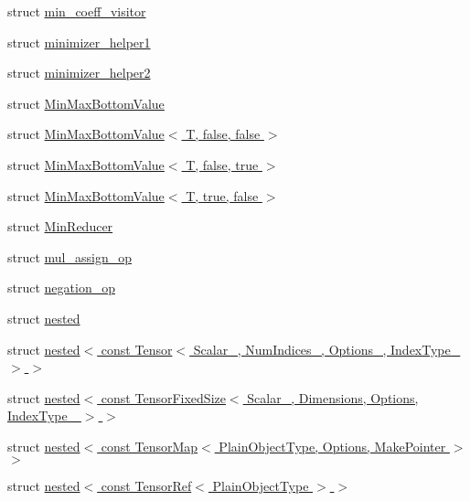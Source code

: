 \begin{DoxyCompactItemize}
struct \hyperlink{struct_eigen_1_1internal_1_1min__coeff__visitor}{min\+\_\+coeff\+\_\+visitor}
\item 
struct \hyperlink{struct_eigen_1_1internal_1_1minimizer__helper1}{minimizer\+\_\+helper1}
\item 
struct \hyperlink{struct_eigen_1_1internal_1_1minimizer__helper2}{minimizer\+\_\+helper2}
\item 
struct \hyperlink{struct_eigen_1_1internal_1_1_min_max_bottom_value}{Min\+Max\+Bottom\+Value}
\item 
struct \hyperlink{struct_eigen_1_1internal_1_1_min_max_bottom_value_3_01_t_00_01false_00_01false_01_4}{Min\+Max\+Bottom\+Value$<$ T, false, false $>$}
\item 
struct \hyperlink{struct_eigen_1_1internal_1_1_min_max_bottom_value_3_01_t_00_01false_00_01true_01_4}{Min\+Max\+Bottom\+Value$<$ T, false, true $>$}
\item 
struct \hyperlink{struct_eigen_1_1internal_1_1_min_max_bottom_value_3_01_t_00_01true_00_01false_01_4}{Min\+Max\+Bottom\+Value$<$ T, true, false $>$}
\item 
struct \hyperlink{struct_eigen_1_1internal_1_1_min_reducer}{Min\+Reducer}
\item 
struct \hyperlink{struct_eigen_1_1internal_1_1mul__assign__op}{mul\+\_\+assign\+\_\+op}
\item 
struct \hyperlink{struct_eigen_1_1internal_1_1negation__op}{negation\+\_\+op}
\item 
struct \hyperlink{struct_eigen_1_1internal_1_1nested}{nested}
\item 
struct \hyperlink{struct_eigen_1_1internal_1_1nested_3_01const_01_tensor_3_01_scalar___00_01_num_indices___00_01_o921ff0e47aa2123e7e0ef990f080072a}{nested$<$ const Tensor$<$ Scalar\+\_\+, Num\+Indices\+\_\+, Options\+\_\+, Index\+Type\+\_\+ $>$ $>$}
\item 
struct \hyperlink{struct_eigen_1_1internal_1_1nested_3_01const_01_tensor_fixed_size_3_01_scalar___00_01_dimensions98981d6c192c4870f523d84eb9e7798b}{nested$<$ const Tensor\+Fixed\+Size$<$ Scalar\+\_\+, Dimensions, Options, Index\+Type\+\_\+ $>$ $>$}
\item 
struct \hyperlink{struct_eigen_1_1internal_1_1nested_3_01const_01_tensor_map_3_01_plain_object_type_00_01_options_00_01_make_pointer_01_4_01_4}{nested$<$ const Tensor\+Map$<$ Plain\+Object\+Type, Options, Make\+Pointer $>$ $>$}
\item 
struct \hyperlink{struct_eigen_1_1internal_1_1nested_3_01const_01_tensor_ref_3_01_plain_object_type_01_4_01_4}{nested$<$ const Tensor\+Ref$<$ Plain\+Object\+Type $>$ $>$}

\end{DoxyCompactItemize}
